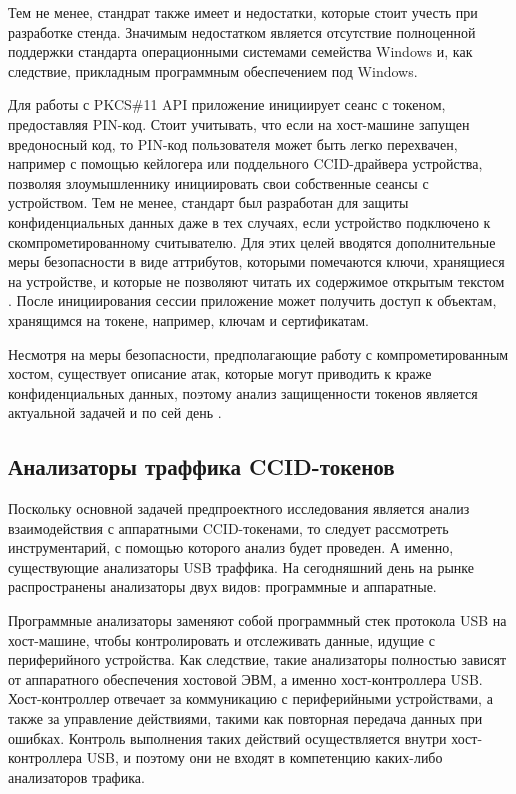 Тем не менее, стандрат также имеет и недостатки, которые стоит учесть при разработке стенда. Значимым недостатком является отсутствие
полноценной поддержки стандарта операционными системами семейства Windows и, как следствие, прикладным программным обеспечением под Windows.

Для работы с PKCS\#11 API приложение инициирует сеанс с токеном, предоставляя PIN-код. Стоит учитывать, что если на хост-машине запущен
вредоносный код, то PIN-код пользователя может быть легко перехвачен, например с помощью кейлогера или поддельного CCID-драйвера устройства,
позволяя злоумышленнику инициировать свои собственные сеансы с устройством.
Тем не менее, стандарт был разработан для защиты конфиденциальных данных даже в тех случаях, если устройство
подключено к скомпрометированному считывателю. Для этих целей вводятся дополнительные меры безопасности в виде аттрибутов, которыми
помечаются ключи, хранящиеся на устройстве, и которые не позволяют читать их содержимое открытым текстом \cite{pkcs-standard}.
После инициирования сессии приложение может получить доступ к объектам, хранящимся на токене, например, ключам и сертификатам.

Несмотря на меры безопасности, предполагающие работу с компрометированным хостом, существует описание атак,
которые могут приводить к краже конфиденциальных данных, поэтому анализ защищенности
токенов является актуальной задачей и по сей день \cite{attack-fix-pkcs}.

\subsection{Анализаторы траффика CCID-токенов}

Поскольку основной задачей предпроектного исследования является анализ взаимодействия с аппаратными CCID-токенами, то следует
рассмотреть инструментарий, с помощью которого анализ будет проведен. А именно, существующие анализаторы USB траффика. На сегодняшний день
на рынке распространены анализаторы двух видов: программные и аппаратные.

Программные анализаторы заменяют собой программный стек протокола USB на хост-машине, чтобы контролировать и отслеживать данные,
идущие с периферийного устройства. Как следствие, такие анализаторы полностью зависят от аппаратного обеспечения хостовой ЭВМ,
а именно хост-контроллера USB. Хост-контроллер отвечает за коммуникацию с периферийными устройствами, а также за управление действиями,
такими как повторная передача данных при ошибках. Контроль выполнения таких действий осуществляется внутри хост-контроллера USB, и поэтому
они не входят в компетенцию каких-либо анализаторов трафика.\cite{hardware-analyzer}

